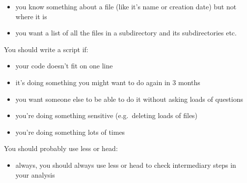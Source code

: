 \documentclass[11pt]{article}
\providecommand{\tightlist}{%
      \setlength{\itemsep}{0pt}\setlength{\parskip}{0pt}}
\begin{document}
\begin{itemize}
\tightlist
\item
  you know something about a file (like it's name or creation date) but
  not where it is
\item
  you want a list of all the files in a subdirectory and its
  subdirectories etc.
\end{itemize}

You should write a script if:

\begin{itemize}
\tightlist
\item
  your code doesn't fit on one line
\item
  it's doing something you might want to do again in 3 months
\item
  you want someone else to be able to do it without asking loads of
  questions
\item
  you're doing something sensitive (e.g.~deleting loads of files)
\item
  you're doing something lots of times
\end{itemize}

You should probably use less or head:

\begin{itemize}
\tightlist
\item
  always, you should always use less or head to check intermediary steps
  in your analysis
\end{itemize}


\end{document}
